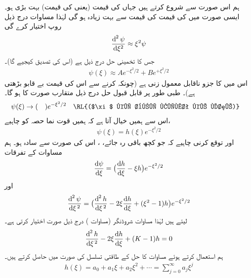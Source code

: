 ہم اس صورت سے شروع کرتے ہیں جہاں  کی قیمت (یعنی  کی قیمت) بہت بڑی ہو۔ ایسی صورت میں
 کی قیمت  کی قیمت سے بہت زیادہ ہو گی لہٰذا مساوات  درج ذیل روپ اختیار کرے گی
\begin{align}
\frac{\dif^{\,2}\psi}{\dif \xi^{2}}\approx \xi^{2}\psi
\end{align}
جس کا تخمینی حل درج ذیل ہے (اس کی تصدیق کیجیے گا)۔ 
\begin{align}\label{مساوات_غیر_تابع_وقت_متقارب_حل}
\psi(\xi)\approx Ae^{-\xi^{2}/2}+Be^{+\xi^{2}/2}
\end{align}
 اس میں  کا جزو ناقابل معمول زنی ہے (چونکہ  کرنے سے اس کی قیمت بے قابو بڑھتی ہے)۔ طبی طور پر قابل قبول حل درج ذیل متقارب صورت کا ہو گا۔
\begin{align}
\psi(\xi)&\to(\quad )e^{-\xi^{2}/2}&&\text{\RL{($\xi$ کی بڑی قیمت کے لئے)}}
\end{align}
اس سے ہمیں خیال آتا ہے کہ ہمیں قوت نما حصہ کو  چاہیے،
\begin{align}\label{مساوات_شروڈنگر_متقارب_الف}
\psi(\xi)=h(\xi)e^{-\xi^{2}/2}
\end{align}
اور توقع کرنی چاہیے کہ جو کچھ باقی رہ جائے، ، اس کی صورت  سے سادہ ہو۔ ہم مساوات  کے تفرقات
\begin{align*}
\frac{\dif{\psi}}{\dif{\xi}}=\big(\frac{\dif{h}}{\dif{\xi}}-\xi h\big )e^{-\xi^{2}/2}
\end{align*}
اور
\begin{align*}
\frac{\dif^{\,2}{\psi}}{\dif{\xi^{\,2}}}=\big (\frac{\dif^{\,2}{h}}{\dif{\xi^{\,2}}}-2\xi\frac{\dif{h}}{\dif{\xi}}+(\xi^{2}-1)h\big )e^{-\xi^{2}/2}
\end{align*}
 لیتے ہیں لہٰذا مساوات شروڈنگر (مساوات ) درج ذیل صورت اختیار کرتی ہے۔
\begin{align}\label{مساوات_شروڈنگر_فروبنیوس_الف}
\frac{\dif^{\,2}{h}}{\dif{\xi^{\,2}}}-2\xi\frac{\dif{h}}{\dif{\xi}}+(K-1)h=0
\end{align}
ہم  استعمال کرتے ہوئے مساوات  کا حل  کے طاقتی تسلسل کی صورت میں حاصل کرتے ہیں۔ 
\begin{align}
h(\xi)=a_{0}+a_{1}\xi+a_{2}\xi^{2}+\cdots = \sum_{j=0}^{\infty}a_{j}\xi^{j}
\end{align}
